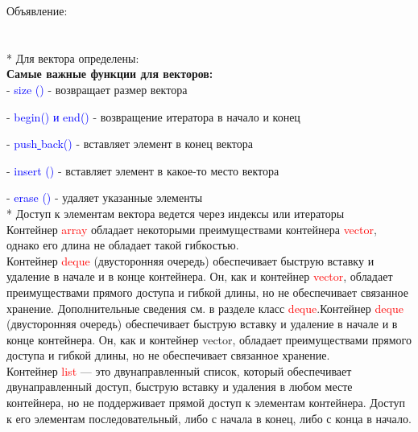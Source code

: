 \documentclass[a4paper,10pt]{article}
\begin{document}
Объявление:
\\
\\ 
\\

* Для вектора определены: 
\\

\textbf{Самые важные функции для векторов:}\\

	- \textcolor{blue}{size ()} - возвращает размер вектора

	- \textcolor{blue}{begin() и end()} - возвращение итератора в начало и конец

	- \textcolor{blue}{push\underline{ }back()} - вставляет элемент в конец вектора

	- \textcolor{blue}{insert ()} - вставляет элемент в какое-то место вектора

	- \textcolor{blue}{erase ()} - удаляет указанные элементы
\\

* Доступ к элементам вектора ведется через индексы или итераторы
\\

Контейнер \textcolor{red}{array} обладает некоторыми преимуществами контейнера \textcolor{red}{vector}, однако его длина не обладает такой гибкостью.
\\

Контейнер \textcolor{red}{deque} (двусторонняя очередь) обеспечивает быструю вставку и удаление в начале и в конце контейнера. Он, как и контейнер \textcolor{red}{vector}, обладает преимуществами прямого доступа и гибкой длины, но не обеспечивает связанное хранение. Дополнительные сведения см. в разделе класс \textcolor{red}{deque}.Контейнер \textcolor{red}{deque} (двусторонняя очередь) обеспечивает быструю вставку и удаление в начале и в конце контейнера. Он, как и контейнер vector, обладает преимуществами прямого доступа и гибкой длины, но не обеспечивает связанное хранение.
\\

Контейнер \textcolor{red}{list} — это двунаправленный список, который обеспечивает двунаправленный доступ, быструю вставку и удаления в любом месте контейнера, но не поддерживает прямой доступ к элементам контейнера. Доступ к его элементам последовательный, либо с начала в конец, либо с конца в начало. 
\\
\end{document}
